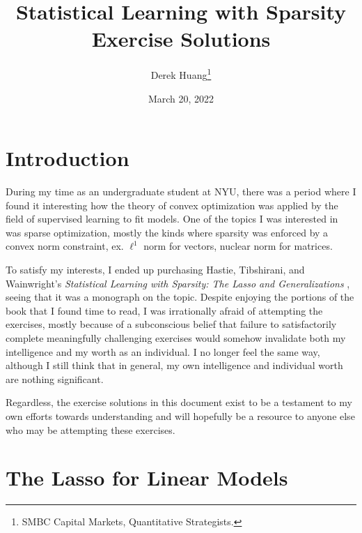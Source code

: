 \documentclass{article}
\title{Statistical Learning with Sparsity \\ \Large Exercise Solutions}
\author{Derek Huang\thanks{SMBC Capital Markets, Quantitative Strategists.}}
\date{March 20, 2022}
\numberwithin{equation}{section}
\begin{document}
\newcommand{\newtocsubsection}[1]{%
    \subsection*{#1} \addcontentsline{toc}{subsection}{#1}%
}

\maketitle


\tableofcontents

\newpage

\section{Introduction}

During my time as an undergraduate student at NYU, there was a period where
I found it interesting how the theory of convex optimization was applied by
the field of supervised learning to fit models. One of the topics I was
interested in was sparse optimization, mostly the kinds where sparsity was
enforced by a convex norm constraint, ex. $ \ell^1 $ norm for vectors,
nuclear norm for matrices.

\medskip

To satisfy my interests, I ended up purchasing Hastie, Tibshirani, and
Wainwright's \textit{%
    Statistical Learning with Sparsity: The Lasso and Generalizations%
}, seeing that it was a monograph on the topic. Despite enjoying the portions
of the book that I found time to read, I was irrationally afraid of
attempting the exercises, mostly because of a subconscious belief that failure
to satisfactorily complete meaningfully challenging exercises would somehow
invalidate both my intelligence and my worth as an individual. I no longer
feel the same way, although I still think that in general, my own intelligence
and individual worth are nothing significant.

\medskip

Regardless, the exercise solutions in this document exist to be a testament
to my own efforts towards understanding and will hopefully be a resource to
anyone else who may be attempting these exercises.

\section{The Lasso for Linear Models}
\end{document}
